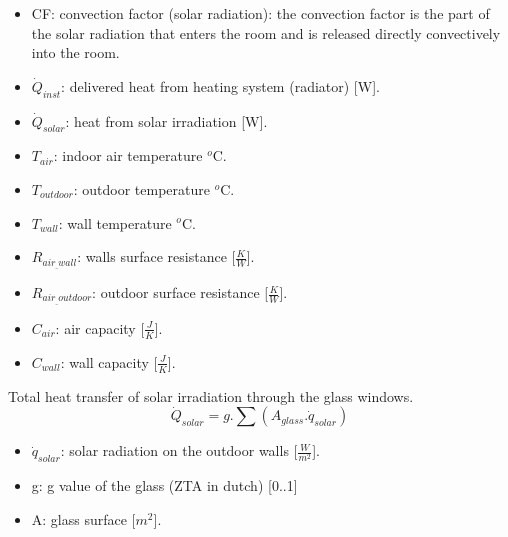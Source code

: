  \begin{itemize}
      \item CF: convection factor (solar radiation): the convection factor is the part of the solar radiation that enters the room and is released directly convectively into the room.
      \item $\dot{Q}_{inst}$: delivered heat from heating system (radiator) [W].
      \item $\dot{Q}_{solar}$: heat from solar irradiation [W].
      \item $T_{air}$: indoor air temperature $^o$C.
      \item $T_{outdoor}$: outdoor temperature $^o$C.
      \item $T_{wall}$: wall temperature $^o$C.
      \item $R_{air_{\_}wall}$: walls surface resistance [$\frac{K}{W}$].
      \item $R_{air_{\_}outdoor}$: outdoor surface resistance [$\frac{K}{W}$].
      \item $C_{air}$: air capacity [$\frac{J}{K}$].
      \item $C_{wall}$: wall capacity [$\frac{J}{K}$].
    \end{itemize}

\newpage   

Total heat transfer of solar irradiation through the glass windows. 
\begin{equation}
\dot{Q}_{solar}=g.\sum(A_{glass}.\dot{q}_{solar})
\end{equation}

\begin{itemize}
    \item $\dot{q}_{solar}$: solar radiation on the outdoor walls [$\frac{W}{m^2}$]. 
    \item g: g value of the glass (ZTA in dutch) [0..1]\cite{zontoetreding}
    \item A: glass surface [$m^2$].
\end{itemize}



\newpage
